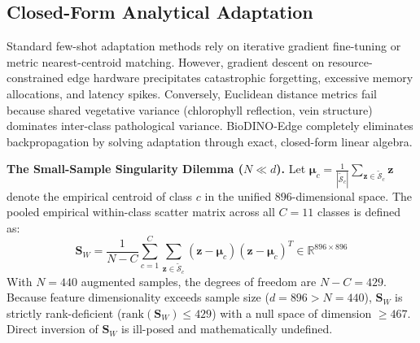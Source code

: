 \documentclass[conference]{IEEEtran}
\begin{document}
\subsection{Closed-Form Analytical Adaptation}
\label{sec:analytical_adaptation}
Standard few-shot adaptation methods rely on iterative gradient fine-tuning or metric nearest-centroid matching. However, gradient descent on resource-constrained edge hardware precipitates catastrophic forgetting, excessive memory allocations, and latency spikes. Conversely, Euclidean distance metrics fail because shared vegetative variance (chlorophyll reflection, vein structure) dominates inter-class pathological variance. BioDINO-Edge completely eliminates backpropagation by solving adaptation through exact, closed-form linear algebra.

\textbf{The Small-Sample Singularity Dilemma ($N \ll d$).} Let $\boldsymbol{\mu}_c = \frac{1}{|\tilde{\mathcal{S}}_c|}\sum_{\mathbf{z} \in \tilde{\mathcal{S}}_c} \mathbf{z}$ denote the empirical centroid of class $c$ in the unified $896$-dimensional space. The pooled empirical within-class scatter matrix across all $C=11$ classes is defined as:
\begin{equation}
    \mathbf{S}_W = \frac{1}{N - C}\sum_{c=1}^C \sum_{\mathbf{z} \in \tilde{\mathcal{S}}_c} (\mathbf{z} - \boldsymbol{\mu}_c)(\mathbf{z} - \boldsymbol{\mu}_c)^T \in \mathbb{R}^{896 \times 896}
\end{equation}
With $N = 440$ augmented samples, the degrees of freedom are $N - C = 429$. Because feature dimensionality exceeds sample size ($d = 896 > N = 440$), $\mathbf{S}_W$ is strictly rank-deficient ($\text{rank}(\mathbf{S}_W) \le 429$) with a null space of dimension $\ge 467$. Direct inversion of $\mathbf{S}_W$ is ill-posed and mathematically undefined.
\end{document}
